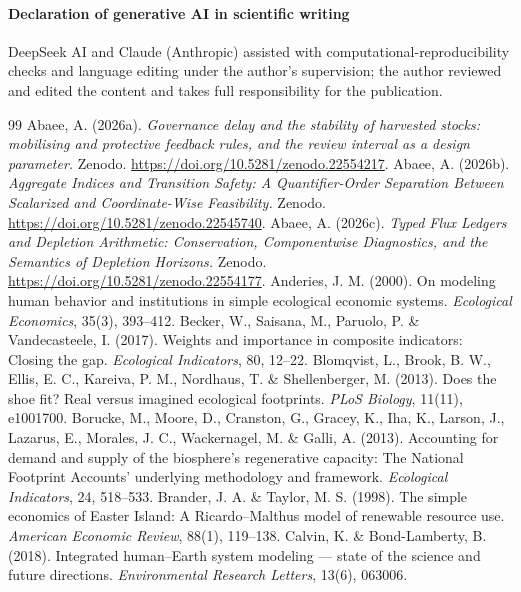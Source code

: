 \documentclass[preprint,12pt,authoryear]{elsarticle}
\begin{document}
\paragraph{Declaration of generative AI in scientific writing} DeepSeek AI and Claude (Anthropic) assisted with computational-reproducibility checks and language editing under the author's supervision; the author reviewed and edited the content and takes full responsibility for the publication.
\begin{thebibliography}{99}
 Abaee, A. (2026a). \emph{Governance delay and the stability of harvested stocks: mobilising and protective feedback rules, and the review interval as a design parameter.} Zenodo. \url{https://doi.org/10.5281/zenodo.22554217}.
 Abaee, A. (2026b). \emph{Aggregate Indices and Transition Safety: A Quantifier-Order Separation Between Scalarized and Coordinate-Wise Feasibility.} Zenodo. \url{https://doi.org/10.5281/zenodo.22545740}.
 Abaee, A. (2026c). \emph{Typed Flux Ledgers and Depletion Arithmetic: Conservation, Componentwise Diagnostics, and the Semantics of Depletion Horizons.} Zenodo. \url{https://doi.org/10.5281/zenodo.22554177}.
 Anderies, J. M. (2000). On modeling human behavior and institutions in simple ecological economic systems. \emph{Ecological Economics}, 35(3), 393--412.
 Becker, W., Saisana, M., Paruolo, P. \& Vandecasteele, I. (2017). Weights and importance in composite indicators: Closing the gap. \emph{Ecological Indicators}, 80, 12--22.
 Blomqvist, L., Brook, B. W., Ellis, E. C., Kareiva, P. M., Nordhaus, T. \& Shellenberger, M. (2013). Does the shoe fit? Real versus imagined ecological footprints. \emph{PLoS Biology}, 11(11), e1001700.
 Borucke, M., Moore, D., Cranston, G., Gracey, K., Iha, K., Larson, J., Lazarus, E., Morales, J. C., Wackernagel, M. \& Galli, A. (2013). Accounting for demand and supply of the biosphere's regenerative capacity: The National Footprint Accounts' underlying methodology and framework. \emph{Ecological Indicators}, 24, 518--533.
 Brander, J. A. \& Taylor, M. S. (1998). The simple economics of Easter Island: A Ricardo--Malthus model of renewable resource use. \emph{American Economic Review}, 88(1), 119--138.
 Calvin, K. \& Bond-Lamberty, B. (2018). Integrated human--Earth system modeling --- state of the science and future directions. \emph{Environmental Research Letters}, 13(6), 063006.

\end{thebibliography}
\end{document}
